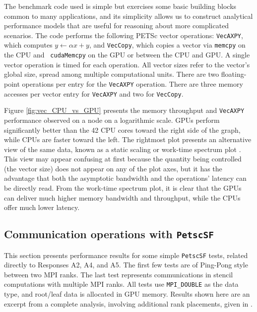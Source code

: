 \documentclass[5p,times]{elsarticle}
\begin{document}
The benchmark code used is
simple but exercises some basic building blocks common to many
applications, and its simplicity allows us to construct analytical performance
models that are useful for reasoning about more complicated scenarios. The code
performs the following PETSc vector operations: {\tt VecAXPY}, which computes $y
\leftarrow \alpha x + y$, %
and
{\tt VecCopy}, which copies a vector via {\tt memcpy} on the CPU and {\tt
cudaMemcpy} on the GPU or between the CPU and GPU.
A single vector operation is timed for each operation. All vector
sizes refer to the vector's global size, spread among multiple
computational units.
There are two floating-point operations per entry for the
{\tt VecAXPY} operation. There are three memory accesses per vector entry
for {\tt VecAXPY} and two for {\tt VecCopy}.


Figure \ref{fig:vec_CPU_vs_GPU} presents the memory throughput and {\tt VecAXPY}
performance observed on a node on a logarithmic scale.
GPUs perform significantly better than the 42 CPU
cores toward the right side of the graph, while CPUs are faster toward the left.
The rightmost plot presents an alternative view of the same data,
known as a static scaling or work-time spectrum plot
\cite{ChangPerformanceSpectrum,ChangTASSpectrum}. This view may appear confusing
at first because the quantity being controlled (the vector size) does not
appear on any of the plot axes, but it has the advantage that both the
asymptotic bandwidth and the operations' latency can be directly read.
From the work-time spectrum plot, it is  clear that the
GPUs can deliver much higher memory bandwidth and throughput, while the CPUs offer
much lower latency.

\subsection{Communication operations with {\tt PetscSF}}
This section presents performance results for some simple {\tt PetscSF} tests, related directly to Responses A2, A4, and A5.
The first few tests are of Ping-Pong style between two MPI ranks.
The last test represents communications in
stencil computations with multiple MPI ranks. All tests use
\texttt{MPI\_DOUBLE} as the data type, %
and root/leaf data is allocated in GPU memory.
Results shown here are an excerpt from a complete analysis, involving additional rank placements, given in \cite{sf-tech-report}.
\end{document}
